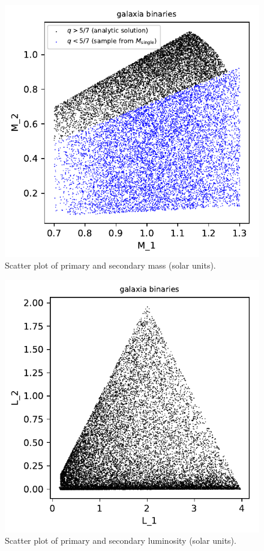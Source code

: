 \documentclass{emulateapj}
\begin{document}
\begin{figure}[!t]
	\begin{center}
		\includegraphics[scale=.8]{figures/galaxia_gammaR_scatter_masses.pdf}
	\end{center}
	\caption{Scatter plot of primary and secondary mass (solar units).}
	\label{fig:galaxia_scatter_masses}
\end{figure}
\begin{figure}[!t]
	\begin{center}
		\includegraphics[scale=.8]{figures/galaxia_gammaR_scatter_luminosities.pdf}
	\end{center}
	\caption{Scatter plot of primary and secondary luminosity (solar units).}
	\label{fig:galaxia_scatter_luminosities}
\end{figure}
\end{document}
